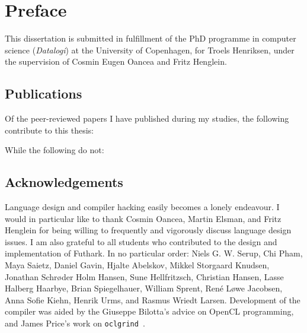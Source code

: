 {}
\chapter*{Preface}

This dissertation is submitted in fulfillment of the PhD programme in
computer science (\textit{Datalogi}) at the University of Copenhagen,
for Troels Henriksen, under the supervision of Cosmin Eugen Oancea and
Fritz Henglein.

\section{Publications}

Of the peer-reviewed papers I have published during my studies, the
following contribute to this thesis:

\begin{quote}
\end{quote}
\begin{quote}
\end{quote}
\begin{quote}
\end{quote}

\noindent While the following do not:

\begin{quote}
\end{quote}
\begin{quote}
\end{quote}
\begin{quote}
\end{quote}

\section{Acknowledgements}

Language design and compiler hacking easily becomes a lonely
endeavour.  I would in particular like to thank Cosmin Oancea, Martin
Elsman, and Fritz Henglein for being willing to frequently and
vigorously discuss language design issues.  I am also grateful to all
students who contributed to the design and implementation of Futhark.
In no particular order: Niels G. W. Serup, Chi Pham, Maya Saietz,
Daniel Gavin, Hjalte Abelskov, Mikkel Storgaard Knudsen, Jonathan
Schrøder Holm Hansen, Sune Hellfritzsch, Christian Hansen, Lasse
Halberg Haarbye, Brian Spiegelhauer, William Sprent, René Løwe
Jacobsen, Anna Sofie Kiehn, Henrik Urms, and Rasmus Wriedt Larsen.
Development of the compiler was aided by the Giuseppe Bilotta's advice
on OpenCL programming, and James Price's work on
\texttt{oclgrind}~\cite{price2015oclgrind}.

